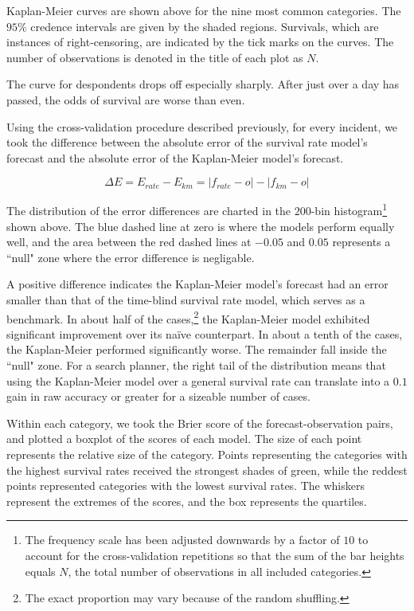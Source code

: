\documentclass[12pt,titlepage]{article}
\begin{document}
    Kaplan-Meier curves are shown above for the nine most common categories.
    The $95\%$ credence intervals are given by the shaded regions. Survivals,
    which are instances of right-censoring, are indicated by the tick marks on
    the curves. The number of observations is denoted in the title of each plot
    as $N$.

    The curve for despondents drops off especially sharply. After just over
    a day has passed, the odds of survival are worse than even.


    

    Using the cross-validation procedure described previously, for every
    incident, we took the difference between the absolute error of the survival
    rate model's forecast and the absolute error of the Kaplan-Meier model's
    forecast.

    $$\Delta E = E_{rate} - E_{km} = |f_{rate} - o| - |f_{km} - o|$$

    The distribution of the error differences are charted in the $200$-bin
    histogram\footnote{The frequency scale has been adjusted downwards by a
    factor of $10$ to account for the cross-validation repetitions so that the
    sum of the bar heights equals $N$, the total number of observations in all
    included categories.} shown above. The blue dashed line at zero is where
    the models perform equally well, and the area between the red dashed lines
    at $-0.05$ and $0.05$ represents a ``null" zone where the error difference
    is negligable.

    A positive difference indicates the Kaplan-Meier model's forecast had an
    error smaller than that of the time-blind survival rate model, which serves
    as a benchmark. In about half of the cases,\footnote{The exact proportion
    may vary because of the random shuffling.} the Kaplan-Meier model
    exhibited significant improvement over its na{\"i}ve counterpart. In about
    a tenth of the cases, the Kaplan-Meier performed significantly worse. The
    remainder fall inside the ``null" zone. For a search planner, the right
    tail of the distribution means that using the Kaplan-Meier model over a
    general survival rate can translate into a $0.1$ gain in raw accuracy or
    greater for a sizeable number of cases.

    

    Within each category, we took the Brier score of the forecast-observation
    pairs, and plotted a boxplot of the scores of each model. The size of each
    point represents the relative size of the category. Points representing the
    categories with the highest survival rates received the strongest shades of
    green, while the reddest points represented categories with the lowest
    survival rates. The whiskers represent the extremes of the scores, and the
    box represents the quartiles.
\end{document}

